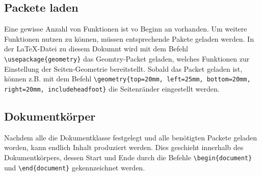 \documentclass[12pt,a4paper]{scrartcl}
\begin{document}
\subsection{Packete laden}
%
Eine gewisse Anzahl von Funktionen ist vo Beginn an vorhanden. 
Um weitere Funktionen nutzen zu können, müssen entsprechende Pakete geladen werden.
In der \LaTeX-Datei zu diesem Dokumnt wird mit dem Befehl \texttt{\textbackslash usepackage\{geometry\}} das Geomtry-Packet geladen, welches Funktionen zur Einstellung der Seiten-Geometrie bereitstellt. 
Sobald das Packet geladen ist, können z.B. mit dem Befehl \texttt{\textbackslash geometry\{top=20mm, left=25mm, bottom=20mm, right=20mm, includeheadfoot\}} die Seitenränder eingestellt werden.
%
\subsection{Dokumentkörper}
%
Nachdem alle die Dokumentklasse festgelegt und alle benötigten Packete geladen worden, kann endlich Inhalt produziert werden.
Dies geschieht innerhalb des Dokumentkörpers, dessen Start und Ende durch die Befehle \texttt{\textbackslash begin\{document\}} und \texttt{\textbackslash end\{document\}} gekenn\-zeichnet werden.
\begin{flushright}

\end{flushright}
%
\end{document}
